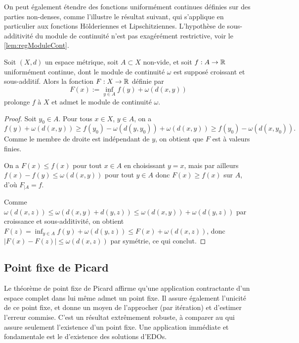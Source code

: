 On peut également étendre des fonctions uniformément continues définies sur des parties non-denses, comme l'illustre le résultat suivant, qui s'applique en particulier aux fonctions Hölderiennes et Lipschitziennes. L'hypothèse de sous-additivité du module de continuité n'est pas exagérément restrictive, voir le \cref{lem:regModuleCont}.

\begin{exemple}
\label{ex:extUnifCont}
%
	Soit $(X,d)$ un espace métrique, soit $A \subset X$ non-vide, et soit $f : A \to \mathbb{R}$ uniformément continue, dont le module de continuité $\omega$ est supposé croissant et sous-additif.
	Alors la fonction $F : X \to \mathbb{R}$ définie par 
	\begin{equation}
		F(x) := \inf_{y \in A} f(y) + \omega(d(x,y))
	\end{equation}
	prolonge $f$ à $X$ et admet le module de continuité $\omega$. 
\end{exemple}

\begin{proof}
	Soit $y_0 \in A$. Pour tous $x \in X$, $y \in A$, on a 
	\begin{equation*}
		f(y) + \omega(d(x,y)) \geq f(y_0) - \omega(d(y,y_0)) + \omega(d(x,y)) \geq f(y_0) - \omega(d(x,y_0)).
	\end{equation*}
	Comme le membre de droite est indépendant de $y$, on obtient que $F$ est à valeurs finies.
	
	On a $F(x) \leq f(x)$ pour tout $x\in A$ en choisissant $y=x$, mais par ailleurs $f(x)-f(y) \leq \omega(d(x,y))$ pour tout $y\in A$ donc $F(x) \geq f(x)$ sur $A$, d'où $F_{|A} = f$. 
	
	Comme $\omega(d(x,z)) \leq \omega(d(x,y) + d(y,z)) \leq \omega(d(x,y)) + \omega(d(y,z))$ par croissance et sous-additivité, 
	on obtient $F(z) = \inf_{y \in A} f(y) + \omega(d(y,z)) \leq F(x) + \omega(d(x,z))$, donc $|F(x)-F(z)| \leq \omega(d(x,z))$ par symétrie, ce qui conclut. 
\end{proof}


\subsection{Point fixe de Picard}
\label{subsec:Picard}

Le théorème de point fixe de Picard affirme qu'une application contractante d'un espace complet dans lui même admet un point fixe. Il assure également l'unicité de ce point fixe, et donne un moyen de l'approcher (par itération) et d'estimer l'erreur commise. C'est un résultat extrêmement robuste, à comparer au  qui assure seulement l'existence d'un point fixe. Une application immédiate et fondamentale est le  d'existence des solutions d'EDOs. 

